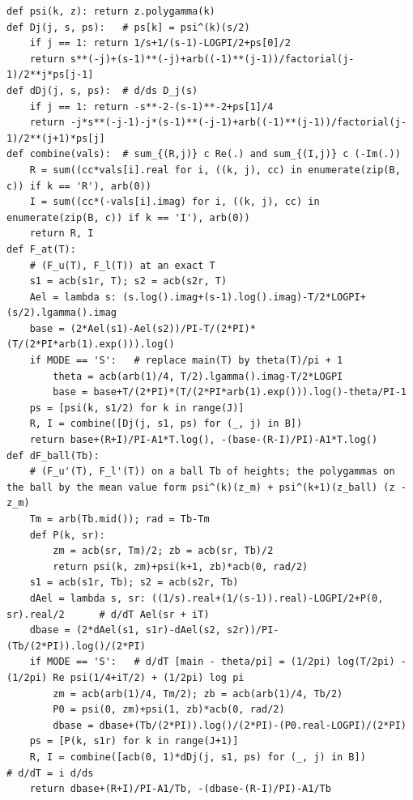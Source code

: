 \documentclass[11pt,reqno]{amsart}
\numberwithin{equation}{section}
\theoremstyle{definition}
\theoremstyle{remark}
\begin{document}
\begin{lstlisting}
def psi(k, z): return z.polygamma(k)
def Dj(j, s, ps):   # ps[k] = psi^(k)(s/2)
    if j == 1: return 1/s+1/(s-1)-LOGPI/2+ps[0]/2
    return s**(-j)+(s-1)**(-j)+arb((-1)**(j-1))/factorial(j-1)/2**j*ps[j-1]
def dDj(j, s, ps):  # d/ds D_j(s)
    if j == 1: return -s**-2-(s-1)**-2+ps[1]/4
    return -j*s**(-j-1)-j*(s-1)**(-j-1)+arb((-1)**(j-1))/factorial(j-1)/2**(j+1)*ps[j]
def combine(vals):  # sum_{(R,j)} c Re(.) and sum_{(I,j)} c (-Im(.))
    R = sum((cc*vals[i].real for i, ((k, j), cc) in enumerate(zip(B, c)) if k == 'R'), arb(0))
    I = sum((cc*(-vals[i].imag) for i, ((k, j), cc) in enumerate(zip(B, c)) if k == 'I'), arb(0))
    return R, I
def F_at(T):
    # (F_u(T), F_l(T)) at an exact T
    s1 = acb(s1r, T); s2 = acb(s2r, T)
    Ael = lambda s: (s.log().imag+(s-1).log().imag)-T/2*LOGPI+(s/2).lgamma().imag
    base = (2*Ael(s1)-Ael(s2))/PI-T/(2*PI)*(T/(2*PI*arb(1).exp())).log()
    if MODE == 'S':   # replace main(T) by theta(T)/pi + 1
        theta = acb(arb(1)/4, T/2).lgamma().imag-T/2*LOGPI
        base = base+T/(2*PI)*(T/(2*PI*arb(1).exp())).log()-theta/PI-1
    ps = [psi(k, s1/2) for k in range(J)]
    R, I = combine([Dj(j, s1, ps) for (_, j) in B])
    return base+(R+I)/PI-A1*T.log(), -(base-(R-I)/PI)-A1*T.log()
def dF_ball(Tb):
    # (F_u'(T), F_l'(T)) on a ball Tb of heights; the polygammas on the ball by the mean value form psi^(k)(z_m) + psi^(k+1)(z_ball) (z - z_m)
    Tm = arb(Tb.mid()); rad = Tb-Tm
    def P(k, sr):
        zm = acb(sr, Tm)/2; zb = acb(sr, Tb)/2
        return psi(k, zm)+psi(k+1, zb)*acb(0, rad/2)
    s1 = acb(s1r, Tb); s2 = acb(s2r, Tb)
    dAel = lambda s, sr: ((1/s).real+(1/(s-1)).real)-LOGPI/2+P(0, sr).real/2      # d/dT Ael(sr + iT)
    dbase = (2*dAel(s1, s1r)-dAel(s2, s2r))/PI-(Tb/(2*PI)).log()/(2*PI)
    if MODE == 'S':   # d/dT [main - theta/pi] = (1/2pi) log(T/2pi) - (1/2pi) Re psi(1/4+iT/2) + (1/2pi) log pi
        zm = acb(arb(1)/4, Tm/2); zb = acb(arb(1)/4, Tb/2)
        P0 = psi(0, zm)+psi(1, zb)*acb(0, rad/2)
        dbase = dbase+(Tb/(2*PI)).log()/(2*PI)-(P0.real-LOGPI)/(2*PI)
    ps = [P(k, s1r) for k in range(J+1)]
    R, I = combine([acb(0, 1)*dDj(j, s1, ps) for (_, j) in B])              # d/dT = i d/ds
    return dbase+(R+I)/PI-A1/Tb, -(dbase-(R-I)/PI)-A1/Tb


\end{lstlisting}
\end{document}
